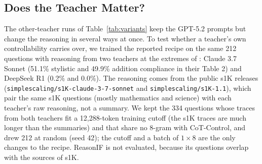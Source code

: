 \subsection{Does the Teacher Matter?}
\label{sec:teacher}
The other-teacher runs of Table~\ref{tab:variants} keep the GPT-5.2 prompts but change the reasoning in several ways at once. To test whether a teacher's own controllability carries over, we trained the reported recipe on the same 212 questions with reasoning from two teachers at the extremes of \citet{chen2026cotcontrol}: Claude 3.7 Sonnet (51.1\% stylistic and 49.9\% addition compliance in their Table 2) and DeepSeek R1 (0.2\% and 0.0\%). The reasoning comes from the public s1K releases (\texttt{simplescaling/s1K-claude-3-7-sonnet} and \texttt{simplescaling/s1K-1.1}), which pair the same s1K questions (mostly mathematics and science) with each teacher's raw reasoning, not a summary. We kept the 334 questions whose traces from both teachers fit a 12,288-token training cutoff (the s1K traces are much longer than the summaries) and that share no 8-gram with CoT-Control, and drew 212 at random (seed 42); the cutoff and a batch of $1\times8$ are the only changes to the recipe. ReasonIF is not evaluated, because its questions overlap with the sources of s1K.

